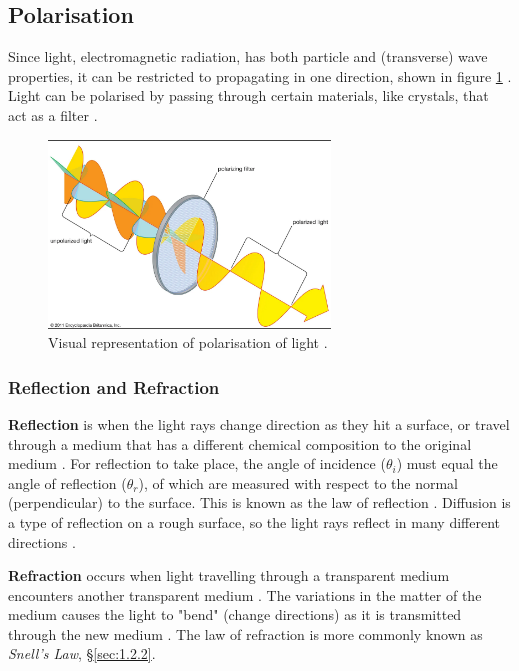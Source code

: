 \documentclass[12pt]{article}
\begin{document}
\subsection{Polarisation} \label{sec:1.2}

Since light, electromagnetic radiation, has both particle and (transverse) wave properties, it can be restricted to propagating in one direction, shown in figure \ref{fig:polar}
\cite{isaacpolar,britpolar}.
Light can be polarised by passing through certain materials, like crystals, that act as a filter 
\cite{britpolar}.

\begin{figure}[H]
    \centering
    \includegraphics[width=7.5cm]{polarisation.png}
    \caption{\centering Visual representation of polarisation of light \protect\cite{britpolar}.}
    \label{fig:polar}
\end{figure}

\subsubsection{Reflection and Refraction} \label{sec:1.2.1}

\textbf{Reflection} is when the light rays change direction as they hit a surface, or travel through a medium that has a different chemical composition to the original medium
\cite{libreref,britref}.
For reflection to take place, the angle of incidence ($\theta_i$) must equal the angle of reflection ($\theta_r$), of which are measured with respect to the normal (perpendicular)
to the surface. This is known as the law of reflection
\cite{libreref,britref}.
Diffusion is a type of reflection on a rough surface, so the light rays reflect in many different directions
\cite{libreref}.

\textbf{Refraction} occurs when light travelling through a transparent medium encounters another transparent medium
\cite{britref}.
The variations in the matter of the medium causes the light to "bend" (change directions) as it is transmitted through the new medium
\cite{libreref}.
The law of refraction is more commonly known as \textit{Snell's Law}, §\ref{sec:1.2.2}.
\end{document}
